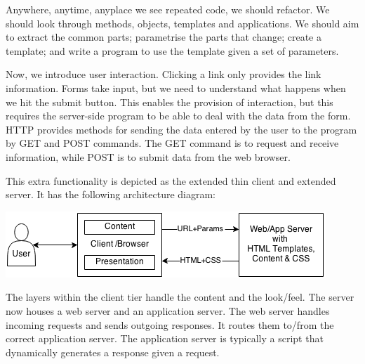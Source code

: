 \documentclass[a4paper, openany]{memoir}
\begin{document}
Anywhere, anytime, anyplace we see repeated code, we should refactor. We should look through methods, objects, templates and applications. We should aim to extract the common parts; parametrise the parts that change; create a template; and write a program to use the template given a set of parameters.

Now, we introduce user interaction. Clicking a link only provides the link information. Forms take input, but we need to understand what happens when we hit the submit button. This enables the provision of interaction, but this requires the server-side program to be able to deal with the data from the form. HTTP provides methods for sending the data entered by the user to the program by GET and POST commands. The GET command is to request and receive information, while POST is to submit data from the web browser.

This extra functionality is depicted as the extended thin client and extended server. It has the following architecture diagram:
\begin{center}
    \includegraphics[scale=0.8]{src/L7I5.png}
\end{center}
The layers within the client tier handle the content and the look/feel. The server now houses a web server and an application server. The web server handles incoming requests and sends outgoing responses. It routes them to/from the correct application server. The application server is typically a script that dynamically generates a response given a request.
\end{document}
